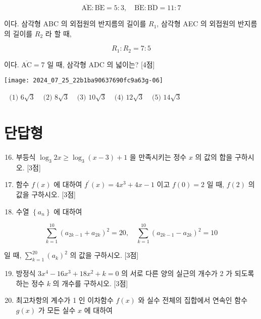 \documentclass[10pt]{article}
\begin{document}
\[
\overline{\mathrm{AE}}: \overline{\mathrm{BE}}=5: 3, \quad \overline{\mathrm{BE}}: \overline{\mathrm{BD}}=11: 7
\]

이다. 삼각형 ABC 의 외접원의 반지름의 길이를 $R_{1}$, 삼각형 AEC 의 외접원의 반지름의 길이를 $R_{2}$ 라 할 때,

\[
R_{1}: R_{2}=7: 5
\]

이다. $\overline{\mathrm{AC}}=7$ 일 때, 삼각형 ADC 의 넓이는? [4점]

\begin{center}
\texttt{[image: 2024\_07\_25\_22b1ba90637690fc9a63g-06]}
\end{center}

$\begin{array}{lllll}\text { (1) } 6 \sqrt{3} & \text { (2) } 8 \sqrt{3} & \text { (3) } 10 \sqrt{3} & \text { (4) } 12 \sqrt{3} & \text { (5) } 14 \sqrt{3}\end{array}$

\section*{단답형}
\begin{enumerate}
  \setcounter{enumi}{15}
  \item 부등식 $\log _{3} 2 x \geq \log _{3}(x-3)+1$ 을 만족시키는 정수 $x$ 의 값의 합을 구하시오. [3점]

  \item 함수 $f(x)$ 에 대하여 $f^{\prime}(x)=4 x^{3}+4 x-1$ 이고 $f(0)=2$ 일 때, $f(2)$ 의 값을 구하시오. [3점]

  \item 수열 $\left\{a_{n}\right\}$ 에 대하여

\end{enumerate}

\[
\sum_{k=1}^{10}\left(a_{2 k-1}+a_{2 k}\right)^{2}=20, \quad \sum_{k=1}^{10}\left(a_{2 k-1}-a_{2 k}\right)^{2}=10
\]

일 때, $\sum_{k=1}^{20}\left(a_{k}\right)^{2}$ 의 값을 구하시오. [3점]

\begin{enumerate}
  \setcounter{enumi}{18}
  \item 방정식 $3 x^{4}-16 x^{3}+18 x^{2}+k=0$ 의 서로 다른 양의 실근의 개수가 2 가 되도록 하는 정수 $k$ 의 개수를 구하시오. [3점]
  \item 최고차항의 계수가 1 인 이차함수 $f(x)$ 와 실수 전체의 집합에서 연속인 함수 $g(x)$ 가 모든 실수 $x$ 에 대하여
\end{enumerate}
\end{document}
